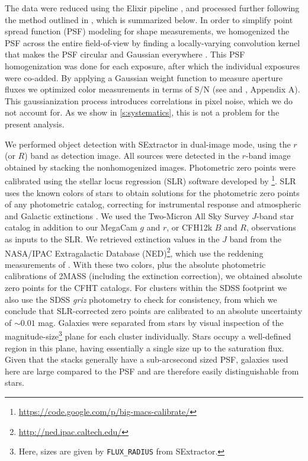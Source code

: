 The data were reduced using the Elixir pipeline \citep{magnier04}, and processed further following 
the method outlined in \cite{vanderburg13}, which is summarized below. In order to simplify point 
spread function (PSF) modeling for shape measurements, we homogenized the PSF across the entire 
field-of-view by finding a locally-varying convolution kernel that makes the PSF circular and 
Gaussian everywhere \citep{kuijken08}. This PSF homogenization was done for each exposure, after 
which the individual exposures were co-added. By applying a Gaussian weight function to measure 
aperture fluxes we optimized color measurements in terms of S/N (see \citealt{kuijken08} and 
\citealt{vanderburg13}, Appendix A). This gaussianization process introduces correlations in pixel 
noise, which we do not account for. As we show in \cref{s:systematics}, this is not a problem for 
the present analysis.

We performed object detection with SExtractor \citep{bertin96} in dual-image mode, using the $r$ 
(or $R$) band as detection image. All sources were detected in the $r$-band image obtained by 
stacking the nonhomogenized images. Photometric zero points were calibrated using the stellar 
locus regression (SLR) software developed by 
\cite{kelly14}\footnote{\url{https://code.google.com/p/big-macs-calibrate/}}. SLR uses the known 
colors of stars to obtain solutions for the photometric zero points of any photometric catalog, 
correcting for instrumental response and atmospheric and Galactic extinctions \citep[see 
also][]{high09}. We used the Two-Micron All Sky Survey \citep[2MASS,][]{skrutskie06} $J$-band star 
catalog in addition to our MegaCam $g$ and $r$, or CFH12k $B$ and $R$, observations as inputs to 
the SLR. We retrieved extinction values in the $J$ band from the NASA/IPAC Extragalactic Database 
(NED)\footnote{\url{http://ned.ipac.caltech.edu/}}, which use the reddening measurements of 
\cite{schlafly11}. With these two colors, plus the absolute photometric calibrations of 2MASS 
(including the extinction correction), we obtained absolute zero points for the CFHT catalogs. For 
clusters within the SDSS footprint we also use the SDSS \textit{griz} photometry to check for 
consistency, from which we conclude that SLR-corrected zero points are calibrated to an absolute 
uncertainty of $\sim\!0.01$ mag. Galaxies were separated from stars by visual inspection of the 
magnitude-size\footnote{Here, sizes are given by \texttt{FLUX\_RADIUS} from SExtractor.} plane for 
each cluster individually. Stars occupy a well-defined region in this plane, having essentially a 
single size up to the saturation flux. Given that the stacks generally have a sub-arcsecond sized 
PSF, galaxies used here are large compared to the PSF and are therefore easily distinguishable from 
stars.

